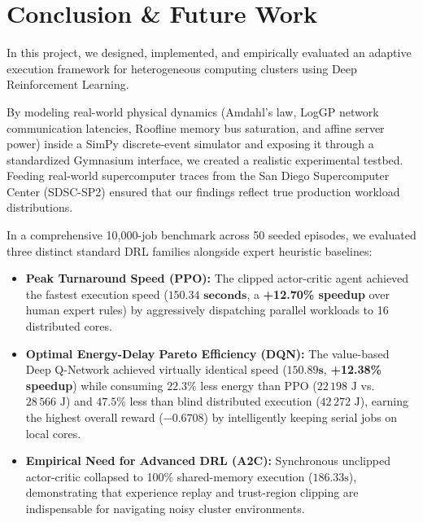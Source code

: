 \documentclass[11pt,a4paper]{article}
\begin{document}
\section{Conclusion \& Future Work}
In this project, we designed, implemented, and empirically evaluated an adaptive execution framework for heterogeneous computing clusters using Deep Reinforcement Learning. 

By modeling real-world physical dynamics (Amdahl's law, LogGP network communication latencies, Roofline memory bus saturation, and affine server power) inside a SimPy discrete-event simulator and exposing it through a standardized Gymnasium interface, we created a realistic experimental testbed. Feeding real-world supercomputer traces from the San Diego Supercomputer Center (SDSC-SP2) ensured that our findings reflect true production workload distributions.

In a comprehensive 10,000-job benchmark across 50 seeded episodes, we evaluated three distinct standard DRL families alongside expert heuristic baselines:
\begin{itemize}[noitemsep, topsep=1pt]
    \item \textbf{Peak Turnaround Speed (PPO):} The clipped actor-critic agent achieved the fastest execution speed ($\mathbf{150.34\text{ seconds}}$, a \textbf{+12.70\% speedup} over human expert rules) by aggressively dispatching parallel workloads to 16 distributed cores.
    \item \textbf{Optimal Energy-Delay Pareto Efficiency (DQN):} The value-based Deep Q-Network achieved virtually identical speed ($\mathbf{150.89\text{s}}$, \textbf{+12.38\% speedup}) while consuming $\mathbf{22.3\%}$ less energy than PPO ($22\,198\text{ J}$ vs.\ $28\,566\text{ J}$) and $\mathbf{47.5\%}$ less than blind distributed execution ($42\,272\text{ J}$), earning the highest overall reward ($\mathbf{-0.6708}$) by intelligently keeping serial jobs on local cores.
    \item \textbf{Empirical Need for Advanced DRL (A2C):} Synchronous unclipped actor-critic collapsed to 100\% shared-memory execution ($186.33\text{s}$), demonstrating that experience replay and trust-region clipping are indispensable for navigating noisy cluster environments.
\end{itemize}
\end{document}
